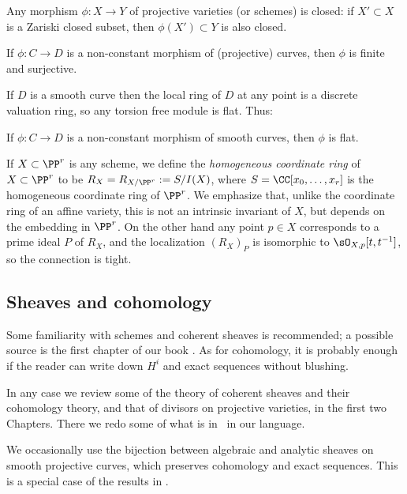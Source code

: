 \begin{theorem}
 Any morphism $\phi: X\to Y$ of projective varieties (or schemes) is closed: if $X'\subset X$ is a Zariski closed subset,
 then $\phi(X') \subset Y$ is also closed.
\end{theorem}

\begin{corollary}
If $\phi: C\to D$ is a non-constant morphism of (projective) curves, then $\phi$ is finite and surjective. 
\end{corollary}

If $D$ is a 
smooth curve then the local ring of $D$ at any point is a discrete valuation ring, so any torsion free module is flat. 
Thus:

\begin{proposition}
If $\phi: C\to D$ is a non-constant morphism of smooth curves, then $\phi$ is flat.
\end{proposition}

If $X\subset \PP^{r}$ is any scheme, we define the \emph{homogeneous coordinate ring} of $X\subset \PP^{r}$
to be $R_{X} = R_{X/\PP^{r}}:= S/I(X)$, where $S =\CC[x_{0}, \dots, x_{r}]$ is the homogeneous coordinate ring of $\PP^{r}$. We emphasize
that, unlike the coordinate ring of an affine variety, this is not an intrinsic invariant of $X$, but depends on the 
embedding in $\PP^{r}$. On the other hand any point $p\in X$ corresponds to a prime ideal $P$ of $R_{X}$, 
and the localization $(R_{X})_{P}$ is isomorphic to $\sO_{X,p}[t,t^{-1}]$, so the connection is tight.

\subsection {Sheaves and cohomology} 

Some familiarity with schemes and coherent sheaves is recommended; a possible source is
the first chapter of our book \cite{GeomSchemes}.
As for cohomology, it is probably enough if the reader can write down $H^i$ and exact sequences without blushing.

In any case we review some of the theory of coherent sheaves and their cohomology theory, and that of divisors on projective 
varieties, in the first two Chapters. There we redo some of what is in~\cite[Chapter IV]{Hartshorne1977}  in our language. 

We occasionally use the bijection between algebraic and analytic sheaves on smooth projective curves, which preserves
cohomology and exact sequences. This is a special case of the results in \cite{GAGA}. 

